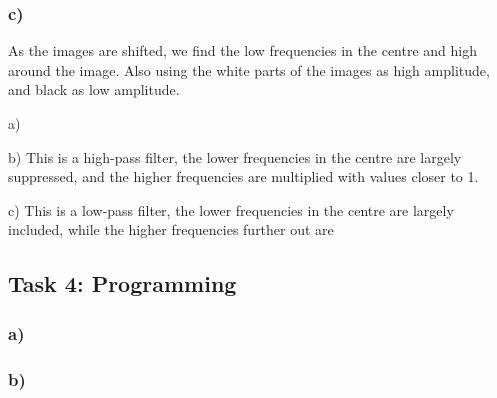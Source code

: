 \subsubsection*{c)}
As the images are shifted, we find the low frequencies in the centre and high around the image. Also using the white parts of the images as high amplitude, and black as low amplitude. 

a)


b)
This is a high-pass filter, the lower frequencies in the centre are largely suppressed, and the higher frequencies are multiplied with values closer to 1. 

c)
This is a low-pass filter, the lower frequencies in the centre are largely included, while the higher frequencies further out are 

\newpage
\subsection{Task 4: Programming}
\subsubsection*{a)}

\subsubsection*{b)}

